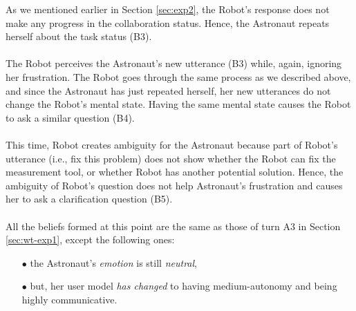 As we mentioned earlier in Section \ref{sec:exp2}, the Robot's response does not
make any progress in the collaboration status. Hence, the Astronaut repeats
herself about the task status (B3).\\

\noindent{}\\

The Robot perceives the Astronaut's new utterance (B3) while, again, ignoring
her frustration. The Robot goes through the same process as we described above,
and since the Astronaut has just repeated herself, her new utterances do not
change the Robot's mental state. Having the same mental state causes the Robot
to ask a similar question (B4).\\

\noindent{}\\

This time, Robot creates ambiguity for the Astronaut because part of Robot's
utterance (i.e., fix this problem) does not show whether the Robot can fix the
measurement tool, or whether Robot has another potential solution. Hence, the
ambiguity of Robot's question does not help Astronaut's frustration and causes
her to ask a clarification question (B5).\\

\noindent{}\\

All the beliefs formed at this point are the same as those of turn A3 in Section
\ref{sec:wt-exp1}, except the following ones:

\begin{itemize}
  \item[$\bullet$] the Astronaut's \textit{emotion} is still \textit{neutral},
  \item[$\bullet$] but, her user model \textit{has changed} to having
  medium-autonomy and being highly communicative.
\end{itemize}

